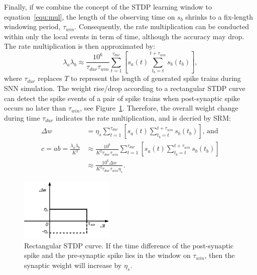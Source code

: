 Finally, if we combine the concept of the STDP learning window to equation~\ref{equ:mul}, the length of the observing time on $s_b$ shrinks to a fix-length windowing period, $\tau_{win}$.
Consequently, the rate multiplication can be conducted within only the local events in term of time, although the accuracy may drop.
The rate multiplication is then approximated by:
\begin{equation}
\lambda_a \lambda_b \approx \frac{10^6}{\tau_{dur} \tau_{win}} \sum_{t=1}^{\tau_{dur}} [s_a(t) \sum_{t_b=t}^{t+\tau_{win}} s_b(t_b)],
\end{equation} 
where $\tau_{dur}$ replaces $T$ to represent the length of generated spike trains during SNN simulation.
The weight rise/drop according to a rectangular STDP curve can detect the spike events of a pair of spike trains when post-synaptic spike occurs no later than $\tau_{win}$, see Figure~\ref{fig:rtg_stdp}.
Therefore, the overall weight change during time $\tau_{dur}$ indicates the rate multiplication, and is decried by SRM:
\begin{equation}
\begin{aligned}
\Delta w &= \eta_s \sum_{t=1}^{\tau_{dur}} [s_a(t) \sum_{t_b=t}^{t+\tau_{win}} s_b(t_b)] \text{, and}\\
c=ab=\frac{\lambda_a \lambda_b}{K^2} &\approx \frac{10^6}{K^2 \tau_{dur} \tau_{win}} \sum_{t=1}^{\tau_{dur}} [s_a(t) \sum_{t_b=t}^{t+\tau_{win}} s_b(t_b)] \\
&\approx  \frac{10^6 \Delta w}{K^2 \tau_{dur} \tau_{win}  \eta_s}.
\end{aligned}
\end{equation} 
\begin{figure}
	\centering
	\includegraphics[width=0.4\textwidth]{pics_sdlm/stdp.pdf}
	\caption{Rectangular STDP curve.
		If the time difference of the post-synaptic spike and the pre-synaptic spike lies in the window on $\tau_{win}$, then the synaptic weight will increase by $\eta_s$.}
	\label{fig:rtg_stdp}
\end{figure}

